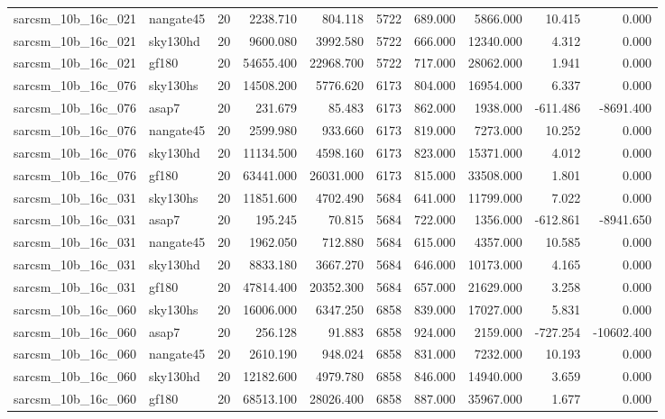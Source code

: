 \begin{tabular}{llrrrrrrrr}
sarcsm\_10b\_16c\_021 & nangate45 & 20 & 2238.710 & 804.118 & 5722 & 689.000 & 5866.000 & 10.415 & 0.000 \\
sarcsm\_10b\_16c\_021 & sky130hd & 20 & 9600.080 & 3992.580 & 5722 & 666.000 & 12340.000 & 4.312 & 0.000 \\
sarcsm\_10b\_16c\_021 & gf180 & 20 & 54655.400 & 22968.700 & 5722 & 717.000 & 28062.000 & 1.941 & 0.000 \\
sarcsm\_10b\_16c\_076 & sky130hs & 20 & 14508.200 & 5776.620 & 6173 & 804.000 & 16954.000 & 6.337 & 0.000 \\
sarcsm\_10b\_16c\_076 & asap7 & 20 & 231.679 & 85.483 & 6173 & 862.000 & 1938.000 & -611.486 & -8691.400 \\
sarcsm\_10b\_16c\_076 & nangate45 & 20 & 2599.980 & 933.660 & 6173 & 819.000 & 7273.000 & 10.252 & 0.000 \\
sarcsm\_10b\_16c\_076 & sky130hd & 20 & 11134.500 & 4598.160 & 6173 & 823.000 & 15371.000 & 4.012 & 0.000 \\
sarcsm\_10b\_16c\_076 & gf180 & 20 & 63441.000 & 26031.000 & 6173 & 815.000 & 33508.000 & 1.801 & 0.000 \\
sarcsm\_10b\_16c\_031 & sky130hs & 20 & 11851.600 & 4702.490 & 5684 & 641.000 & 11799.000 & 7.022 & 0.000 \\
sarcsm\_10b\_16c\_031 & asap7 & 20 & 195.245 & 70.815 & 5684 & 722.000 & 1356.000 & -612.861 & -8941.650 \\
sarcsm\_10b\_16c\_031 & nangate45 & 20 & 1962.050 & 712.880 & 5684 & 615.000 & 4357.000 & 10.585 & 0.000 \\
sarcsm\_10b\_16c\_031 & sky130hd & 20 & 8833.180 & 3667.270 & 5684 & 646.000 & 10173.000 & 4.165 & 0.000 \\
sarcsm\_10b\_16c\_031 & gf180 & 20 & 47814.400 & 20352.300 & 5684 & 657.000 & 21629.000 & 3.258 & 0.000 \\
sarcsm\_10b\_16c\_060 & sky130hs & 20 & 16006.000 & 6347.250 & 6858 & 839.000 & 17027.000 & 5.831 & 0.000 \\
sarcsm\_10b\_16c\_060 & asap7 & 20 & 256.128 & 91.883 & 6858 & 924.000 & 2159.000 & -727.254 & -10602.400 \\
sarcsm\_10b\_16c\_060 & nangate45 & 20 & 2610.190 & 948.024 & 6858 & 831.000 & 7232.000 & 10.193 & 0.000 \\
sarcsm\_10b\_16c\_060 & sky130hd & 20 & 12182.600 & 4979.780 & 6858 & 846.000 & 14940.000 & 3.659 & 0.000 \\
sarcsm\_10b\_16c\_060 & gf180 & 20 & 68513.100 & 28026.400 & 6858 & 887.000 & 35967.000 & 1.677 & 0.000 \\

\end{tabular}
